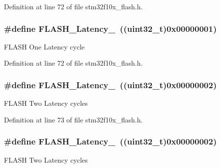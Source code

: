 Definition at line 72 of file stm32f10x\+\_\+flash.\+h.

\subsubsection[{\texorpdfstring{F\+L\+A\+S\+H\+\_\+\+Latency\+\_\+1}{FLASH_Latency_1}}]{\setlength{\rightskip}{0pt plus 5cm}\#define F\+L\+A\+S\+H\+\_\+\+Latency\+\_~(({\bf uint32\+\_\+t})0x00000001)}\hypertarget{group___flash___latency_ga6b7281665340fe8f7919bdfcfd06f8e6}{}\label{group___flash___latency_ga6b7281665340fe8f7919bdfcfd06f8e6}
F\+L\+A\+SH One Latency cycle 

Definition at line 72 of file stm32f10x\+\_\+flash.\+h.

\subsubsection[{\texorpdfstring{F\+L\+A\+S\+H\+\_\+\+Latency\+\_\+2}{FLASH_Latency_2}}]{\setlength{\rightskip}{0pt plus 5cm}\#define F\+L\+A\+S\+H\+\_\+\+Latency\+\_~(({\bf uint32\+\_\+t})0x00000002)}\hypertarget{group___flash___latency_ga55173ebb5c978459ce18d5e2516e3e89}{}\label{group___flash___latency_ga55173ebb5c978459ce18d5e2516e3e89}
F\+L\+A\+SH Two Latency cycles 

Definition at line 73 of file stm32f10x\+\_\+flash.\+h.

\subsubsection[{\texorpdfstring{F\+L\+A\+S\+H\+\_\+\+Latency\+\_\+2}{FLASH_Latency_2}}]{\setlength{\rightskip}{0pt plus 5cm}\#define F\+L\+A\+S\+H\+\_\+\+Latency\+\_~(({\bf uint32\+\_\+t})0x00000002)}\hypertarget{group___flash___latency_ga55173ebb5c978459ce18d5e2516e3e89}{}\label{group___flash___latency_ga55173ebb5c978459ce18d5e2516e3e89}
F\+L\+A\+SH Two Latency cycles 

